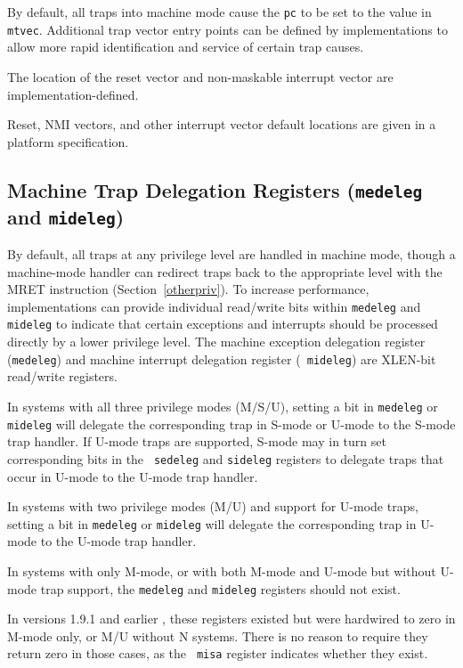 By default, all traps into machine mode cause the {\tt pc} to be set to the
value in {\tt mtvec}.  Additional trap vector entry points can be defined by
implementations to allow more rapid identification and service of certain trap
causes.

The location of the reset vector and non-maskable interrupt vector are
implementation-defined.

\begin{commentary}
Reset, NMI vectors, and other interrupt vector default locations are
given in a platform specification.
\end{commentary}

\subsection{Machine Trap Delegation Registers ({\tt medeleg} and {\tt mideleg})}

By default, all traps at any privilege level are handled in machine
mode, though a machine-mode handler can redirect traps back to the
appropriate level with the MRET instruction (Section~\ref{otherpriv}).
To increase performance, implementations can provide individual
read/write bits within {\tt medeleg} and {\tt mideleg} to indicate
that certain exceptions and interrupts should be processed directly by
a lower privilege level.  The machine exception delegation register
({\tt medeleg}) and machine interrupt delegation register ({\tt
  mideleg}) are XLEN-bit read/write registers.

In systems with all three privilege modes (M/S/U), setting a bit in
{\tt medeleg} or {\tt mideleg} will delegate the corresponding trap in
S-mode or U-mode to the S-mode trap handler. If U-mode traps are
supported, S-mode may in turn set corresponding bits in the {\tt
  sedeleg} and {\tt sideleg} registers to delegate traps that occur in
U-mode to the U-mode trap handler.

In systems with two privilege modes (M/U) and support for U-mode
traps, setting a bit in {\tt medeleg} or {\tt mideleg} will
delegate the corresponding trap in U-mode to the U-mode trap handler.

In systems with only M-mode, or with both M-mode and U-mode but
without U-mode trap support, the {\tt medeleg} and {\tt mideleg}
registers should not exist.
\begin{commentary}
  In versions 1.9.1 and earlier , these registers existed but were
  hardwired to zero in M-mode only, or M/U without N systems.  There
  is no reason to require they return zero in those cases, as the {\tt
    misa} register indicates whether they exist.
\end{commentary}


